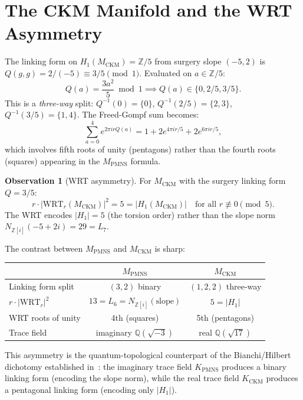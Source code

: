 \documentclass[11pt,a4paper]{article}
\theoremstyle{definition}
\newtheorem{observation}[theorem]{Observation}
\newcommand{\MPMNS}{M_{\mathrm{PMNS}}}
\newcommand{\MCKM}{M_{\mathrm{CKM}}}
\newcommand{\KPMNS}{K_{\mathrm{PMNS}}}
\newcommand{\KCKM}{K_{\mathrm{CKM}}}
\newcommand{\ZZ}{\mathbb{Z}}
\newcommand{\QQ}{\mathbb{Q}}
\newcommand{\Zfive}{\mathbb{Z}/5}
\newcommand{\Zi}{\mathbb{Z}[i]}
\newcommand{\WRT}{\mathrm{WRT}}
\begin{document}
\section{The CKM Manifold and the WRT Asymmetry}
\label{sec:ckm_wrt}

The linking form on $H_1(\MCKM) = \Zfive$ from surgery slope $(-5,2)$
is $Q(g,g) = 2/(-5) \equiv 3/5 \pmod{1}$.
Evaluated on $a \in \ZZ/5$:
\[
Q(a) = \frac{3a^2}{5} \bmod 1
\implies
Q(a) \in \{0, 2/5, 3/5\}.
\]
This is a \emph{three-way} split: $Q^{-1}(0) = \{0\}$,
$Q^{-1}(2/5) = \{2,3\}$, $Q^{-1}(3/5) = \{1,4\}$.
The Freed-Gompf sum becomes:
\[
\sum_{a=0}^{4} e^{2\pi i r Q(a)}
= 1 + 2e^{4\pi i r/5} + 2e^{6\pi i r/5},
\]
which involves fifth roots of unity (pentagons) rather than the
fourth roots (squares) appearing in the $\MPMNS$ formula.

\begin{observation}[WRT asymmetry]
\label{obs:asymm}
For $\MCKM$ with the surgery linking form $Q = 3/5$:
\begin{equation}
r \cdot |\WRT_r(\MCKM)|^2 = 5 = |H_1(\MCKM)|
\quad \text{for all } r \not\equiv 0 \pmod{5}.
\end{equation}
The WRT encodes $|H_1| = 5$ (the torsion order) rather than the slope
norm $N_{\Zi}(-5+2i) = 29 = L_7$.
\end{observation}

The contrast between $\MPMNS$ and $\MCKM$ is sharp:
\begin{center}
\begin{tabular}{lcc}
\toprule
 & $\MPMNS$ & $\MCKM$ \\
\midrule
Linking form split & $(3,2)$ binary & $(1,2,2)$ three-way \\
$r \cdot |\WRT_r|^2$ & $13 = L_6 = N_{\Zi}(\text{slope})$ & $5 = |H_1|$ \\
WRT roots of unity & 4th (squares) & 5th (pentagons) \\
Trace field & imaginary $\QQ(\sqrt{-3})$ & real $\QQ(\sqrt{17})$ \\
\bottomrule
\end{tabular}
\end{center}

This asymmetry is the quantum-topological counterpart of the
Bianchi/Hilbert dichotomy established in~\cite{Gentry:X011}:
the imaginary trace field $\KPMNS$ produces a binary linking form
(encoding the slope norm), while the real trace field $\KCKM$
produces a pentagonal linking form (encoding only $|H_1|$).
\end{document}
